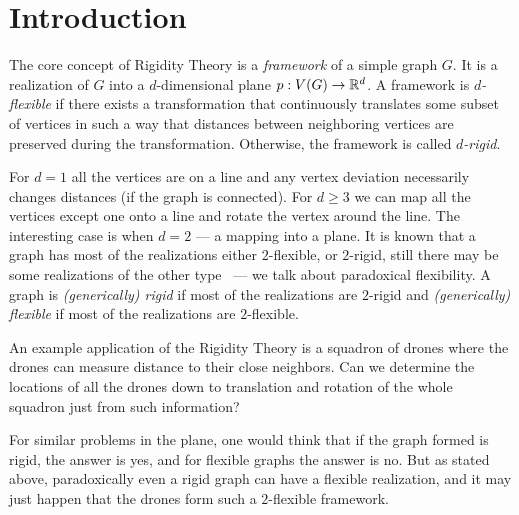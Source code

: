 
\chapter{Introduction}
\setcounter{page}{1}


The core concept of Rigidity Theory is a \emph{framework} of a simple graph \(G\).
It is a realization of \(G\) into a \(d\)-dimensional plane \(p: V(G) \to \mathbb{R}^d\).
A framework is \emph{\( d \)-flexible} if there exists a transformation
that continuously translates some subset of vertices in such a way that
distances between neighboring vertices are preserved during the transformation.
Otherwise, the framework is called \emph{\( d \)-rigid}.

For \( d = 1 \) all the vertices are on a line
and any vertex deviation necessarily changes distances (if the graph is connected).
%
For \( d \ge 3 \) we can map all the vertices except one onto a line and
rotate the vertex around the line.
%
The interesting case is when \( d = 2 \) --- a mapping into a plane.
It is known that a graph has most of the realizations
either \( 2 \)-flexible, or \( 2 \)-rigid,
still there may be some realizations of the other type~\cite{generically_rigid_graphs}
--- we talk about paradoxical flexibility.
A graph is \emph{(generically) rigid} if most of the realizations are \( 2 \)-rigid
and \emph{(generically) flexible} if most of the realizations are \( 2 \)-flexible.

An example application of the Rigidity Theory is a squadron of drones
where the drones can measure distance to their close neighbors.
Can we determine the locations of all the drones
down to translation and rotation of the whole squadron
just from such information?

For similar problems in the plane,
one would think that if the graph formed is rigid, the answer is yes, and
for flexible graphs the answer is no.
But as stated above, paradoxically even a rigid graph can have a flexible realization,
and it may just happen that the drones form such a \( 2 \)-flexible framework.

